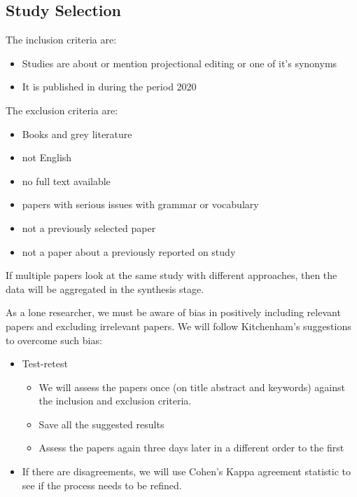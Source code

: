 \subsection{Study Selection}

The inclusion criteria are:
\begin{itemize}
       \item Studies are about or mention projectional editing or one of it's synonyms
       \item It is published in during the period 2020
\end{itemize}

The exclusion criteria are:
\begin{itemize}
       \item Books and grey literature
       \item not English
       \item no full text available
       \item papers with serious issues with grammar or vocabulary
       \item not a previously selected paper
       \item not a paper about a previously reported on study
\end{itemize}

If multiple papers look at the same study with different approaches, then the data will be aggregated in the synthesis stage.

As a lone researcher, we must be aware of bias in positively including relevant papers and excluding irrelevant papers.
We will follow Kitchenham's suggestions to overcome such bias:
\begin{itemize}
       \item Test-retest 
       \begin{itemize}
              \item We will assess the papers once (on title abstract and keywords) against the inclusion and exclusion criteria.
              \item Save all the suggested results
              \item Assess the papers again three days later in a different order to the first  
       \end{itemize}
       \item If there are disagreements, we will use Cohen's Kappa agreement statistic\cite{Cohen_1960} to see if the process needs to be refined.
\end{itemize} 

